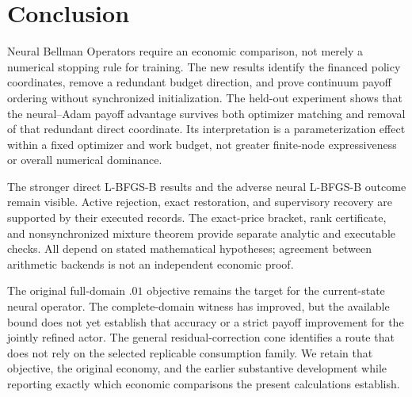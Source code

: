 \section{Conclusion}\label{sec:r23conclusion}
Neural Bellman Operators require an economic comparison, not merely a numerical stopping rule for training. The new results identify the financed policy coordinates, remove a redundant budget direction, and prove continuum payoff ordering without synchronized initialization. The held-out experiment shows that the neural--Adam payoff advantage survives both optimizer matching and removal of that redundant direct coordinate. Its interpretation is a parameterization effect within a fixed optimizer and work budget, not greater finite-node expressiveness or overall numerical dominance.

The stronger direct L-BFGS-B results and the adverse neural L-BFGS-B outcome remain visible. Active rejection, exact restoration, and supervisory recovery are supported by their executed records. The exact-price bracket, rank certificate, and nonsynchronized mixture theorem provide separate analytic and executable checks. All depend on stated mathematical hypotheses; agreement between arithmetic backends is not an independent economic proof.

The original full-domain $.01$ objective remains the target for the current-state neural operator. The complete-domain witness has improved, but the available bound does not yet establish that accuracy or a strict payoff improvement for the jointly refined actor. The general residual-correction cone identifies a route that does not rely on the selected replicable consumption family. We retain that objective, the original economy, and the earlier substantive development while reporting exactly which economic comparisons the present calculations establish.
